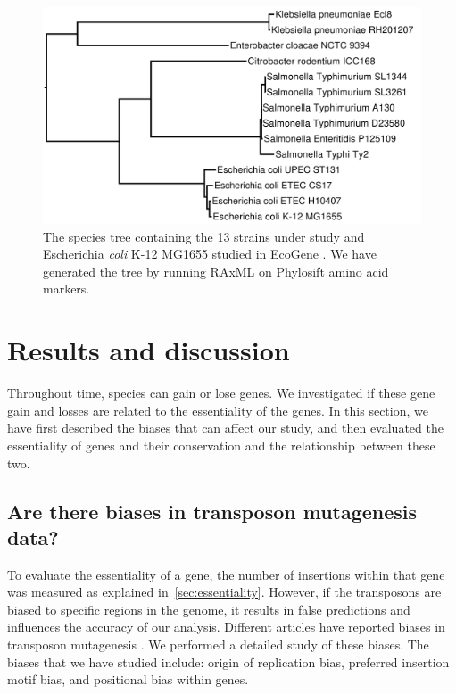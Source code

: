 \documentclass[12pt,letterpaper]{article}
\begin{document}
\begin{figure}
\includegraphics[scale=0.2]{phylosift-aa-raxmlbootstrap.pdf}
\caption{The species tree containing the 13 strains under study and Escherichia \textit{coli} K-12 MG1655 studied in EcoGene \cite{zhou_ecogene_2013}. We have generated the tree by running RAxML \cite{stamatakis_raxml_2014} on Phylosift \cite{darling_phylosift:_2014} amino acid markers.}
\label{fig:species-tree}
\end{figure}

\section{Results and discussion}
Throughout time, species can gain or lose genes. We investigated if these gene gain and losses are related to the essentiality of the genes. In this section, we have first described the biases that can affect our study, and then evaluated the essentiality of genes and their conservation and the relationship between these two.

\subsection{Are there biases in transposon mutagenesis data?}
To evaluate the essentiality of a gene, the number of insertions within that gene was measured as explained in~\ref{sec:essentiality}. However, if the transposons are biased to specific regions in the genome, it results in false predictions and influences the accuracy of our analysis. Different articles have reported biases in transposon mutagenesis \cite{barquist_comparison_2013, green_insertion_2012, rubin_essential_2015, kimura_nucleoid_2016}. We performed a detailed study of these biases. The biases that we have studied include: origin of replication bias, preferred insertion motif bias, and positional bias within genes.
\end{document}
